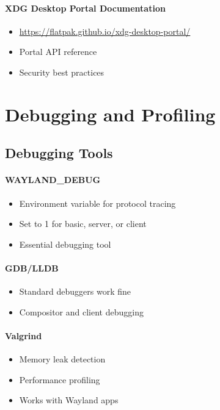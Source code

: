 \paragraph{XDG Desktop Portal Documentation}
\begin{itemize}
    \item \url{https://flatpak.github.io/xdg-desktop-portal/}
    \item Portal API reference
    \item Security best practices
\end{itemize}

\section{Debugging and Profiling}

\subsection{Debugging Tools}

\paragraph{WAYLAND\_DEBUG}
\begin{itemize}
    \item Environment variable for protocol tracing
    \item Set to 1 for basic, server, or client
    \item Essential debugging tool
\end{itemize}

\paragraph{GDB/LLDB}
\begin{itemize}
    \item Standard debuggers work fine
    \item Compositor and client debugging
\end{itemize}

\paragraph{Valgrind}
\begin{itemize}
    \item Memory leak detection
    \item Performance profiling
    \item Works with Wayland apps
\end{itemize}


